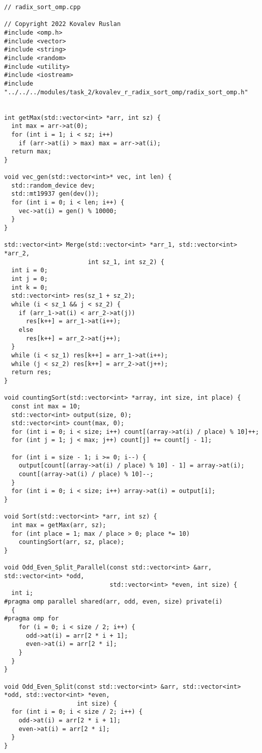 \documentclass{report}
\begin{document}
\begin{lstlisting}
// radix_sort_omp.cpp

// Copyright 2022 Kovalev Ruslan
#include <omp.h>
#include <vector>
#include <string>
#include <random>
#include <utility>
#include <iostream>
#include "../../../modules/task_2/kovalev_r_radix_sort_omp/radix_sort_omp.h"


int getMax(std::vector<int> *arr, int sz) {
  int max = arr->at(0);
  for (int i = 1; i < sz; i++)
    if (arr->at(i) > max) max = arr->at(i);
  return max;
}

void vec_gen(std::vector<int>* vec, int len) {
  std::random_device dev;
  std::mt19937 gen(dev());
  for (int i = 0; i < len; i++) {
    vec->at(i) = gen() % 10000;
  }
}

std::vector<int> Merge(std::vector<int> *arr_1, std::vector<int> *arr_2,
                       int sz_1, int sz_2) {
  int i = 0;
  int j = 0;
  int k = 0;
  std::vector<int> res(sz_1 + sz_2);
  while (i < sz_1 && j < sz_2) {
    if (arr_1->at(i) < arr_2->at(j))
      res[k++] = arr_1->at(i++);
    else
      res[k++] = arr_2->at(j++);
  }
  while (i < sz_1) res[k++] = arr_1->at(i++);
  while (j < sz_2) res[k++] = arr_2->at(j++);
  return res;
}

void countingSort(std::vector<int> *array, int size, int place) {
  const int max = 10;
  std::vector<int> output(size, 0);
  std::vector<int> count(max, 0);
  for (int i = 0; i < size; i++) count[(array->at(i) / place) % 10]++;
  for (int j = 1; j < max; j++) count[j] += count[j - 1];

  for (int i = size - 1; i >= 0; i--) {
    output[count[(array->at(i) / place) % 10] - 1] = array->at(i);
    count[(array->at(i) / place) % 10]--;
  }
  for (int i = 0; i < size; i++) array->at(i) = output[i];
}

void Sort(std::vector<int> *arr, int sz) {
  int max = getMax(arr, sz);
  for (int place = 1; max / place > 0; place *= 10)
    countingSort(arr, sz, place);
}

void Odd_Even_Split_Parallel(const std::vector<int> &arr, std::vector<int> *odd,
                             std::vector<int> *even, int size) {
  int i;
#pragma omp parallel shared(arr, odd, even, size) private(i)
  {
#pragma omp for
    for (i = 0; i < size / 2; i++) {
      odd->at(i) = arr[2 * i + 1];
      even->at(i) = arr[2 * i];
    }
  }
}

void Odd_Even_Split(const std::vector<int> &arr, std::vector<int> *odd, std::vector<int> *even,
                    int size) {
  for (int i = 0; i < size / 2; i++) {
    odd->at(i) = arr[2 * i + 1];
    even->at(i) = arr[2 * i];
  }
}


\end{lstlisting}
\end{document}

